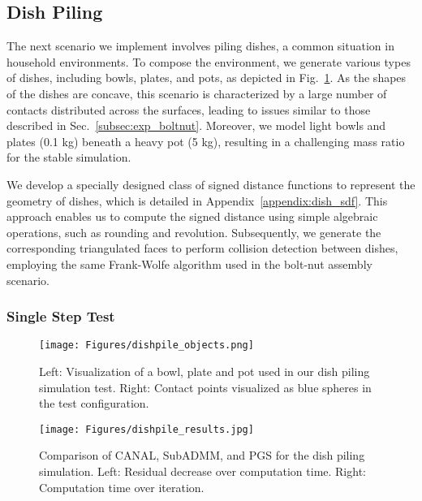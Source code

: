 \documentclass[lettersize,journal]{IEEEtran}
\begin{document}
\subsection{Dish Piling}

The next scenario we implement involves piling dishes, a common situation in household environments. To compose the environment, we generate various types of dishes, including bowls, plates, and pots, as depicted in Fig.~\ref{fig:dishpile_objects}. As the shapes of the dishes are concave, this scenario is characterized by a large number of contacts distributed across the surfaces, leading to issues similar to those described in  Sec.~\ref{subsec:exp_boltnut}. Moreover, we model light bowls and plates (0.1 kg) beneath a heavy pot (5 kg), resulting in a challenging mass ratio for the stable simulation.

We develop a specially designed class of signed distance functions to represent the geometry of dishes, which is detailed in Appendix~\ref{appendix:dish_sdf}. This approach enables us to compute the signed distance using simple algebraic operations, such as rounding and revolution. Subsequently, we generate the corresponding triangulated faces to perform collision detection between dishes, employing the same Frank-Wolfe algorithm used in the bolt-nut assembly scenario.



\subsubsection{Single Step Test}

\begin{figure}[t]
\centering
\texttt{[image: Figures/dishpile\_objects.png]}
\caption{Left: Visualization of a bowl, plate and pot used in our dish piling simulation test. Right: Contact points visualized as blue spheres in the test configuration.}
\label{fig:dishpile_objects}
\end{figure}

\begin{figure}[t]
\centering
\texttt{[image: Figures/dishpile\_results.jpg]}
\caption{Comparison of CANAL, SubADMM, and PGS for the dish piling simulation. Left: Residual decrease over computation time. Right: Computation time over iteration.}
\label{fig:dishpile_singlestep}
\end{figure}
\end{document}
